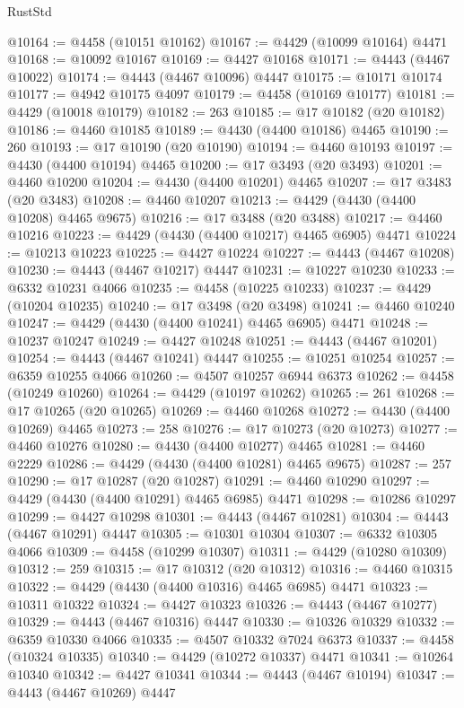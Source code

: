 \begin{lexlean}{RustStd}
\begin{coremodule}
@10164 := @4458 (@10151 @10162)
@10167 := @4429 (@10099 @10164) @4471
@10168 := @10092 @10167
@10169 := @4427 @10168
@10171 := @4443 (@4467 @10022)
@10174 := @4443 (@4467 @10096) @4447
@10175 := @10171 @10174
@10177 := @4942 @10175 @4097
@10179 := @4458 (@10169 @10177)
@10181 := @4429 (@10018 @10179)
@10182 := 263
@10185 := @17 @10182 (@20 @10182)
@10186 := @4460 @10185
@10189 := @4430 (@4400 @10186) @4465
@10190 := 260
@10193 := @17 @10190 (@20 @10190)
@10194 := @4460 @10193
@10197 := @4430 (@4400 @10194) @4465
@10200 := @17 @3493 (@20 @3493)
@10201 := @4460 @10200
@10204 := @4430 (@4400 @10201) @4465
@10207 := @17 @3483 (@20 @3483)
@10208 := @4460 @10207
@10213 := @4429 (@4430 (@4400 @10208) @4465 @9675)
@10216 := @17 @3488 (@20 @3488)
@10217 := @4460 @10216
@10223 := @4429 (@4430 (@4400 @10217) @4465 @6905) @4471
@10224 := @10213 @10223
@10225 := @4427 @10224
@10227 := @4443 (@4467 @10208)
@10230 := @4443 (@4467 @10217) @4447
@10231 := @10227 @10230
@10233 := @6332 @10231 @4066
@10235 := @4458 (@10225 @10233)
@10237 := @4429 (@10204 @10235)
@10240 := @17 @3498 (@20 @3498)
@10241 := @4460 @10240
@10247 := @4429 (@4430 (@4400 @10241) @4465 @6905) @4471
@10248 := @10237 @10247
@10249 := @4427 @10248
@10251 := @4443 (@4467 @10201)
@10254 := @4443 (@4467 @10241) @4447
@10255 := @10251 @10254
@10257 := @6359 @10255 @4066
@10260 := @4507 @10257 @6944 @6373
@10262 := @4458 (@10249 @10260)
@10264 := @4429 (@10197 @10262)
@10265 := 261
@10268 := @17 @10265 (@20 @10265)
@10269 := @4460 @10268
@10272 := @4430 (@4400 @10269) @4465
@10273 := 258
@10276 := @17 @10273 (@20 @10273)
@10277 := @4460 @10276
@10280 := @4430 (@4400 @10277) @4465
@10281 := @4460 @2229
@10286 := @4429 (@4430 (@4400 @10281) @4465 @9675)
@10287 := 257
@10290 := @17 @10287 (@20 @10287)
@10291 := @4460 @10290
@10297 := @4429 (@4430 (@4400 @10291) @4465 @6985) @4471
@10298 := @10286 @10297
@10299 := @4427 @10298
@10301 := @4443 (@4467 @10281)
@10304 := @4443 (@4467 @10291) @4447
@10305 := @10301 @10304
@10307 := @6332 @10305 @4066
@10309 := @4458 (@10299 @10307)
@10311 := @4429 (@10280 @10309)
@10312 := 259
@10315 := @17 @10312 (@20 @10312)
@10316 := @4460 @10315
@10322 := @4429 (@4430 (@4400 @10316) @4465 @6985) @4471
@10323 := @10311 @10322
@10324 := @4427 @10323
@10326 := @4443 (@4467 @10277)
@10329 := @4443 (@4467 @10316) @4447
@10330 := @10326 @10329
@10332 := @6359 @10330 @4066
@10335 := @4507 @10332 @7024 @6373
@10337 := @4458 (@10324 @10335)
@10340 := @4429 (@10272 @10337) @4471
@10341 := @10264 @10340
@10342 := @4427 @10341
@10344 := @4443 (@4467 @10194)
@10347 := @4443 (@4467 @10269) @4447

\end{coremodule}
\end{lexlean}
